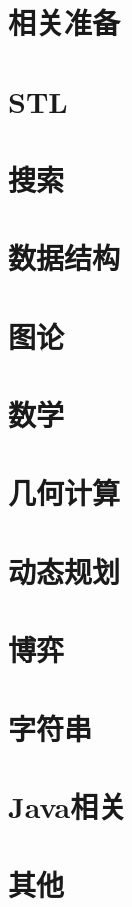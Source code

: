 \documentclass[11pt, a4paper, twoside, final]{book}
\begin{document}


\frontmatter
\tableofcontents

\mainmatter

\chapter{相关准备}


\chapter{STL}


\chapter{搜索}


\chapter{数据结构}


\chapter{图论}


\chapter{数学}


\chapter{几何计算}


\chapter{动态规划}


\chapter{博弈}


\chapter{字符串}


\chapter{Java相关}


\chapter{其他}

\end{document}

